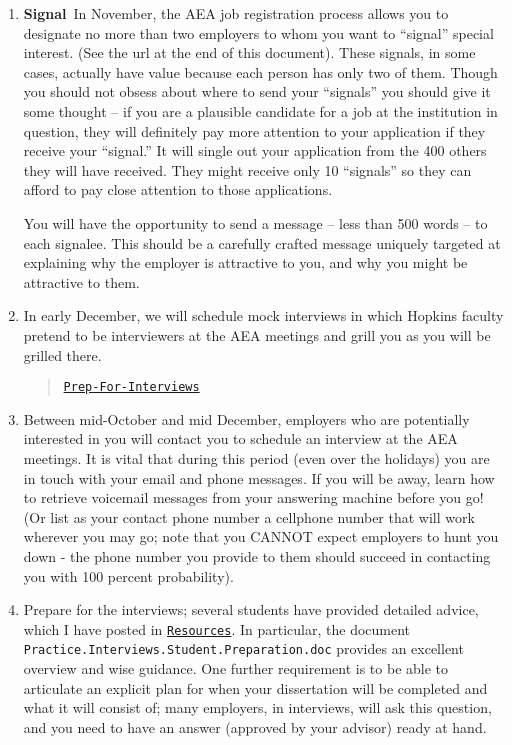 \documentclass{\classes/econtex}
\begin{document}
\begin{enumerate}
\item \ifdvi\hypertarget{Signal}{\textbf{Signal}~}\fi In November, the AEA job registration process 
  allows you to designate no more than two employers to whom you want
  to ``signal'' special interest.  (See the url at the end of this
  document).  These signals, in some cases, actually have value because 
  each person has only two of them.  Though you should not obsess about 
  where to send your ``signals'' you should give it some thought -- if you
  are a plausible candidate for a job at the institution in question, they
  will definitely pay more attention to your application if they receive your 
  ``signal.''  It will single out your application from the 400 others they will have received.
  They might receive only 10 ``signals'' so they can afford to pay close attention
  to those applications.

  You will have the opportunity to send a message -- less than 500 words -- to each signalee.  This should be a carefully crafted message uniquely targeted at explaining why the employer is attractive to you, and why you might be attractive to them.

  
  \hypertarget{Mock-Interviews}{}
\item In early December, we will schedule mock interviews in which
  Hopkins faculty pretend to be interviewers at the AEA meetings and
  grill you as you will be grilled there.

  \begin{quote}
    \href{\pageurl/Steps#Prep-For-Interviews}{\texttt{Prep-For-Interviews}}
  \end{quote}
  
  \hypertarget{Be-Reachable}{}
\item Between mid-October and mid December, employers who are
  potentially interested in you will contact you to schedule an
  interview at the AEA meetings.  It is vital that during this period
  (even over the holidays) you are in touch with your email and phone
  messages.  If you will be away, learn how to retrieve voicemail
  messages from your answering machine before you go!  (Or list as
  your contact phone number a cellphone number that will work wherever
  you may go; note that you CANNOT expect employers to hunt you down -
  the phone number you provide to them should succeed in contacting
  you with 100 percent probability).
  
  \hypertarget{Prep-For-Interviews}{} %
\item Prepare for the interviews; several students have provided
  detailed advice, which I have posted in \href{\treeurl/Resources}{\texttt{Resources}}.  In particular, the document
  \texttt{Practice.Interviews.Student.Preparation.doc} provides an
  excellent overview and wise guidance. One further requirement is to be
  able to articulate an explicit plan for when your dissertation will
  be completed and what it will consist of; many employers, in
  interviews, will ask this question, and you need to have an answer
  (approved by your advisor) ready at hand.


\end{enumerate}
\end{document}
